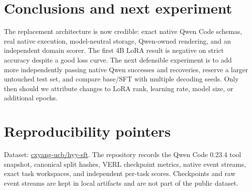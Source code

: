 \documentclass[10.5pt]{article}
\begin{document}
\section{Conclusions and next experiment}
The replacement architecture is now credible: exact native Qwen Code schemas,
real native execution, model-neutral storage, Qwen-owned rendering, and an
independent domain scorer.  The first 4B LoRA result is negative on strict
accuracy despite a good loss curve.  The next defensible experiment is to add
more independently passing native Qwen successes and recoveries, reserve a
larger untouched test set, and compare base/SFT with multiple decoding seeds.
Only then should we attribute changes to LoRA rank, learning rate, model size,
or additional epochs.

\section*{Reproducibility pointers}
Dataset: \href{https://huggingface.co/datasets/cxyang-ucb/hyy-sft}{cxyang-ucb/hyy-sft}.
The repository records the Qwen Code 0.23.4 tool snapshot, canonical split
hashes, VERL checkpoint metrics, native event streams, exact task workspaces,
and independent per-task scores.  Checkpoints and raw event streams are kept in
local artifacts and are not part of the public dataset.
\end{document}
